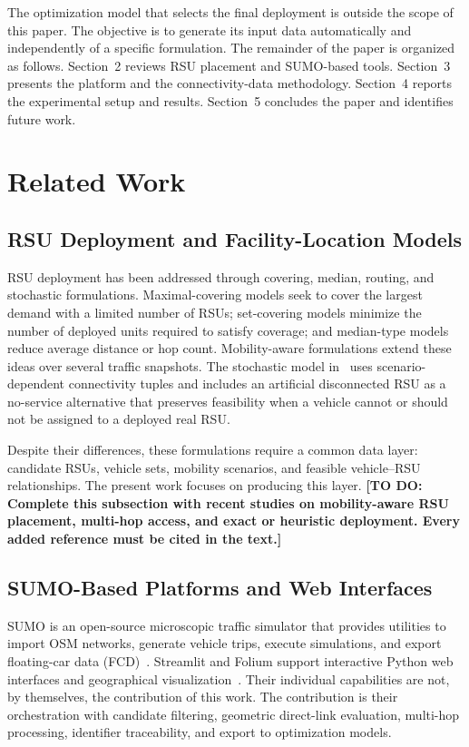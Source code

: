 \documentclass[engproc,proceedingpaper,submit,oneauthor]{Definitions/mdpi}
\newcommand{\todo}[1]{{\color{todored}\textbf{[TO DO: #1]}}}
\begin{document}
The optimization model that selects the final deployment is outside the scope of this paper. The objective is to generate its input data automatically and independently of a specific formulation. The remainder of the paper is organized as follows. Section~2 reviews RSU placement and SUMO-based tools. Section~3 presents the platform and the connectivity-data methodology. Section~4 reports the experimental setup and results. Section~5 concludes the paper and identifies future work.

\section{Related Work}
\subsection{RSU Deployment and Facility-Location Models}
RSU deployment has been addressed through covering, median, routing, and stochastic formulations. Maximal-covering models seek to cover the largest demand with a limited number of RSUs; set-covering models minimize the number of deployed units required to satisfy coverage; and median-type models reduce average distance or hop count. Mobility-aware formulations extend these ideas over several traffic snapshots. The stochastic model in~\cite{ref-urquiza} uses scenario-dependent connectivity tuples and includes an artificial disconnected RSU as a no-service alternative that preserves feasibility when a vehicle cannot or should not be assigned to a deployed real RSU.

Despite their differences, these formulations require a common data layer: candidate RSUs, vehicle sets, mobility scenarios, and feasible vehicle--RSU relationships. The present work focuses on producing this layer. \todo{Complete this subsection with recent studies on mobility-aware RSU placement, multi-hop access, and exact or heuristic deployment. Every added reference must be cited in the text.}

\subsection{SUMO-Based Platforms and Web Interfaces}
SUMO is an open-source microscopic traffic simulator that provides utilities to import OSM networks, generate vehicle trips, execute simulations, and export floating-car data (FCD)~\cite{ref-sumo,ref-osm}. Streamlit and Folium support interactive Python web interfaces and geographical visualization~\cite{ref-streamlit,ref-folium}. Their individual capabilities are not, by themselves, the contribution of this work. The contribution is their orchestration with candidate filtering, geometric direct-link evaluation, multi-hop processing, identifier traceability, and export to optimization models.
\end{document}
